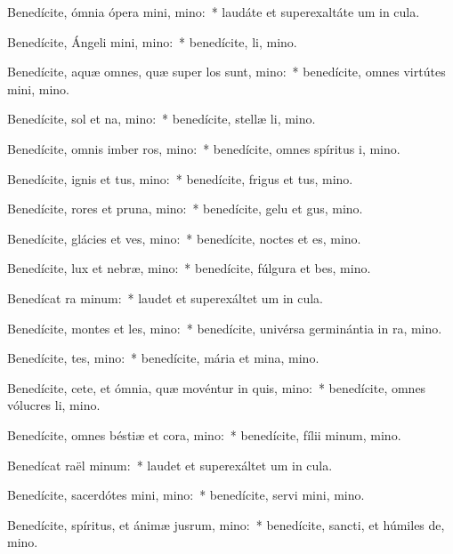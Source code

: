 \item Benedícite, ómnia ópera mini, mino:~* laudáte et superexaltáte um in cula.
\item Benedícite, Ángeli mini, mino:~* benedícite, li, mino.
\item Benedícite, aquæ omnes, quæ super los sunt, mino:~* benedícite, omnes virtútes mini, mino.
\item Benedícite, sol et na, mino:~* benedícite, stellæ li, mino.
\item Benedícite, omnis imber  ros, mino:~* benedícite, omnes spíritus i, mino.
\item Benedícite, ignis et tus, mino:~* benedícite, frigus et tus, mino.
\item Benedícite, rores et pruna, mino:~* benedícite, gelu et gus, mino.
\item Benedícite, glácies et ves, mino:~* benedícite, noctes et es, mino.
\item Benedícite, lux et nebræ, mino:~* benedícite, fúlgura et bes, mino.
\item Benedícat ra minum:~* laudet et superexáltet um in cula.
\item Benedícite, montes et les, mino:~* benedícite, univérsa germinántia in ra, mino.
\item Benedícite, tes, mino:~* benedícite, mária et mina, mino.
\item Benedícite, cete, et ómnia, quæ movéntur in quis, mino:~* benedícite, omnes vólucres li, mino.
\item Benedícite, omnes béstiæ et cora, mino:~* benedícite, fílii minum, mino.
\item Benedícat raël minum:~* laudet et superexáltet um in cula.
\item Benedícite, sacerdótes mini, mino:~* benedícite, servi mini, mino.
\item Benedícite, spíritus, et ánimæ jusrum, mino:~* benedícite, sancti, et húmiles de, mino.
